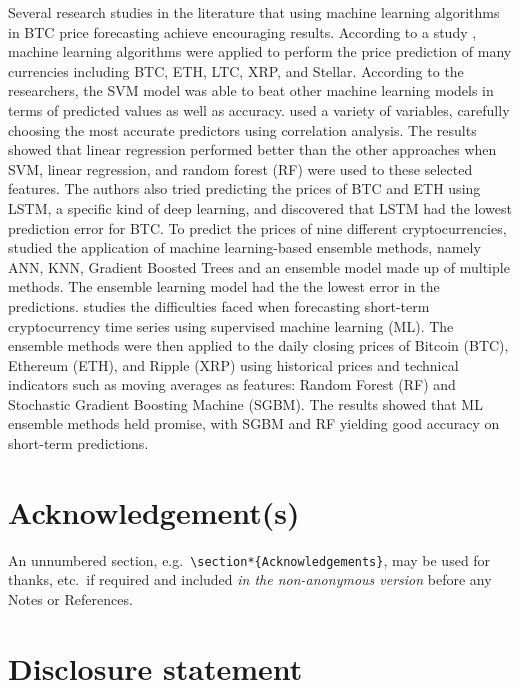 \documentclass[]{interact}
\theoremstyle{plain}%
\theoremstyle{definition}
\theoremstyle{remark}
\begin{document}
Several research studies in the literature that using machine learning
algorithms in BTC price forecasting achieve encouraging results.
According to a study \citep{hitam2021}, machine learning algorithms were
applied to perform the price prediction of many currencies including
BTC, ETH, LTC, XRP, and Stellar. According to the researchers, the SVM
model was able to beat other machine learning models in terms of
predicted values as well as accuracy. \citep{saad19} used a variety of
variables, carefully choosing the most accurate predictors using
correlation analysis. The results showed that linear regression
performed better than the other approaches when SVM, linear regression,
and random forest (RF) were used to these selected features. The authors
also tried predicting the prices of BTC and ETH using LSTM, a specific
kind of deep learning, and discovered that LSTM had the lowest
prediction error for BTC. To predict the prices of nine different
cryptocurrencies, \citep{chowdhury20} studied the application of machine
learning-based ensemble methods, namely ANN, KNN, Gradient Boosted Trees
and an ensemble model made up of multiple methods. The ensemble learning
model had the the lowest error in the predictions. \citep{derbentsev21}
studies the difficulties faced when forecasting short-term
cryptocurrency time series using supervised machine learning (ML). The
ensemble methods were then applied to the daily closing prices of
Bitcoin (BTC), Ethereum (ETH), and Ripple (XRP) using historical prices
and technical indicators such as moving averages as features: Random
Forest (RF) and Stochastic Gradient Boosting Machine (SGBM). The results
showed that ML ensemble methods held promise, with SGBM and RF yielding
good accuracy on short-term predictions.

\section*{Acknowledgement(s)}\label{acknowledgements}

An unnumbered section,
e.g.~\texttt{\textbackslash{}section*\{Acknowledgements\}}, may be used
for thanks, etc.~if required and included \emph{in the non-anonymous
version} before any Notes or References.

\section*{Disclosure statement}\label{disclosure-statement}
\end{document}
